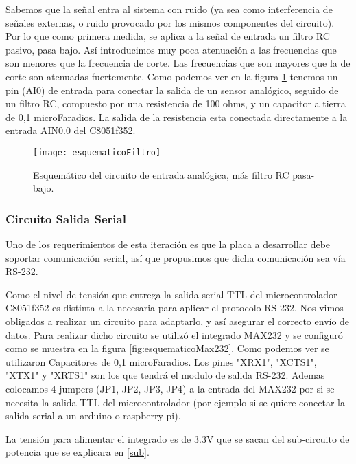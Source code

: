 Sabemos que la señal entra al sistema con ruido (ya sea como interferencia de señales externas, o ruido provocado por los mismos componentes del circuito). Por lo que como primera medida, se aplica a la señal de entrada un filtro RC pasivo, pasa bajo. Así introducimos muy poca atenuación a las frecuencias que son menores que la frecuencia de corte. Las frecuencias que son mayores que la de corte son atenuadas fuertemente. 
Como podemos ver en la figura \ref{fig:esquematicoFiltro} tenemos un pin (AI0) de entrada para conectar la salida de un sensor analógico, seguido de un filtro RC, compuesto por una resistencia de 100 ohms, y un capacitor a tierra de 0,1 microFaradios. La salida de la resistencia esta conectada directamente a la entrada AIN0.0 del C8051f352.

\begin{figure}[H]
  \centering
  \texttt{[image: esquematicoFiltro]}
  \caption{Esquemático del circuito de entrada analógica, más filtro RC pasa-bajo.}\label{fig:esquematicoFiltro}
\end{figure}


\subsubsection{Circuito Salida Serial}
\label{salida_serial}

Uno de los requerimientos de esta iteración es que la placa a desarrollar debe soportar comunicación serial, así que propusimos que dicha comunicación sea vía RS-232.

Como el nivel de tensión que entrega la salida serial TTL del microcontrolador C8051f352 es distinta a la necesaria para aplicar el protocolo RS-232. Nos vimos obligados a realizar un circuito para adaptarlo, y así asegurar el correcto envío de datos. Para realizar dicho circuito se utilizó el integrado MAX232 y se configuró como se muestra en la figura \ref{fig:esquematicoMax232}. Como podemos ver se utilizaron Capacitores de 0,1 microFaradios. Los pines "XRX1", "XCTS1", "XTX1" y "XRTS1" son los que tendrá el modulo de salida RS-232.
Ademas colocamos 4 jumpers (JP1, JP2, JP3, JP4) a la entrada del MAX232 por si se necesita la salida TTL del microcontrolador (por ejemplo si se quiere conectar la salida serial a un arduino o raspberry pi).

La tensión para alimentar el integrado es de 3.3V que se sacan del sub-circuito de potencia que se explicara en \ref{sub}.

